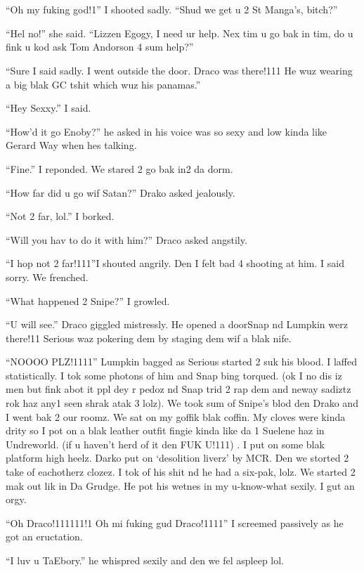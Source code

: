 \section{}


\XXX{\Xfill 666\Xfill}

\enquote{Oh my fuking god!1} I shooted sadly. \enquote{Shud we get u 2 St Manga's, bitch?}

\enquote{Hel no!} she said. \enquote{Lizzen Egogy, I need ur help. Nex tim u go bak in tim, do u fink u kod ask Tom Andorson 4 sum help?}

\enquote{Sure I said sadly. I went outside the door. Draco was there!111 He wuz wearing a big blak GC tshit which wuz his panamas.}

\enquote{Hey Sexxy.} I said.

\enquote{How'd it go Enoby?} he asked in his voice was so sexy and low kinda like Gerard Way when hes talking.

\enquote{Fine.} I reponded. We stared 2 go bak in2 da dorm.

\enquote{How far did u go wif Satan?} Drako asked jealously.

\enquote{Not 2 far, lol.} I borked.

\enquote{Will you hav to do it with him?} Draco asked angstily.

\enquote{I hop not 2 far!111}\@ I shouted angrily. Den I felt bad 4 shooting at him. I said sorry. We frenched.

\enquote{What happened 2 Snipe?} I growled.

\enquote{U will see.} Draco giggled mistressly. He opened a door\dotfill\newline\phantom{}\dotfill Snap nd Lumpkin werz there!11 Serious waz pokering dem by staging dem wif a blak nife.

\enquote{NOOOO PLZ!1111} Lumpkin bagged as Serious started 2 suk his blood. I laffed statistically. I tok some photons of him and Snap bing torqued. (ok I no dis iz men but fink abot it ppl dey r pedoz nd Snap trid 2 rap dem and neway sadiztz rok haz any1 seen shrak atak 3 lolz). We took sum of Snipe's blod den Drako and I went bak 2 our roomz. We sat on my goffik blak coffin. My cloves were kinda drity so I pot on a blak leather outfit fingie kinda like da 1 Suelene haz in Undreworld. (if u haven't herd of it den FUK U!111) . I put on some blak platform high heelz. Darko put on `desolition liverz' by MCR. Den\dotfill\newline
we storted 2 take of eachotherz clozez. I tok of his shit nd he had a six-pak, lolz. We started 2 mak out lik in Da Grudge. He pot his wetnes in my u-know-what sexily. I gut an orgy.

\begin{sloppypar}
    \enquote{Oh Draco!111111!\@1 Oh mi fuking gud Draco!1111} I screemed passively as he got an eructation.
\end{sloppypar}

\enquote{I luv u TaEbory.} he whispred sexily and den we fel aspleep lol.
